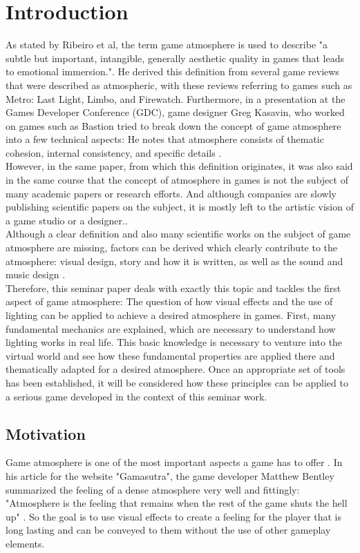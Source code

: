 \chapter{Introduction}
As stated by Ribeiro et al, the term game atmosphere is used to describe "a subtle but important, intangible, generally aesthetic quality in games that leads to emotional immersion."\cite{Ribeiro.2020}. He derived this definition from several game reviews that were described as atmospheric, with these reviews referring to games such as Metro: Last Light, Limbo, and Firewatch. 
Furthermore, in a presentation at the Games Developer Conference (GDC), game designer Greg Kasavin, who worked on games such as Bastion tried to break down the concept of game atmosphere into a few technical aspects: He notes that atmosphere consists of thematic cohesion, internal consistency, and specific details \cite{GDD}.\\

However, in the same paper, from which this definition originates, it was also said in the same course that the concept of atmosphere in games is not the subject of many academic papers or research efforts. And although companies are slowly publishing scientific papers on the subject, it is mostly left to the artistic vision of a game studio or a designer.\cite{Ribeiro.2020}.
\\
Although a clear definition and also many scientific works on the subject of game atmosphere are missing, factors can be derived which clearly contribute to the atmosphere: visual design, story and how it is written, as well as the sound and music design \cite{MDA}.
\\
Therefore, this seminar paper deals with exactly this topic and tackles the first aspect of game atmosphere: The question of how visual effects and the use of lighting can be applied to achieve a desired atmosphere in games. First, many fundamental mechanics are explained, which are necessary to understand how lighting works in real life. This basic knowledge is necessary to venture into the virtual world and see how these fundamental properties are applied there and thematically adapted for a desired atmosphere. Once an appropriate set of tools has been established, it will be considered how these principles can be applied to a serious game developed in the context of this seminar work.

\section{Motivation}
Game atmosphere is one of the most important aspects a game has to offer \cite{Ribeiro.2020}. In his article for the website "Gamasutra", the game developer Matthew Bentley summarized the feeling of a dense atmosphere very well and fittingly: "Atmosphere is the feeling that remains when the rest of the game shuts the hell up" \cite{Gamasutra}. So the goal is to use visual effects to create a feeling for the player that is long lasting and can be conveyed to them without the use of other gameplay elements. \\


